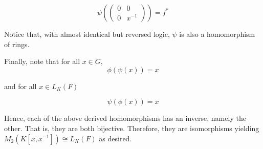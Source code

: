 \begin{solution}
    $$\psi(\left(\begin{array}{cc} 0 & 0 \\ 0 & x^{-1} \end{array}\right))=f^*$$

    Notice that, with almost identical but reversed logic, $\psi$ is also a homomorphism of rings.

    Finally, note that for all $x\in G$, 
    $$\phi(\psi(x))=x$$

    and for all $x\in L_K(F)$

    $$\psi(\phi(x))=x$$

    Hence, each of the above derived homomorphisms has an inverse, namely the other. That is, they are
    both bijective. Therefore, they are isomorphisms yielding $M_2(K[x,x^{-1}])\cong L_K(F)$ as desired.
\end{solution}